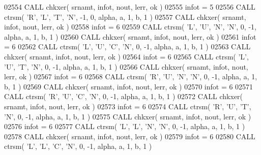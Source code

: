 \begin{DoxyCode}
02554       \textcolor{keyword}{CALL }chkxer( srnamt, infot, nout, lerr, ok )
02555       infot = 5
02556       \textcolor{keyword}{CALL }ctrsm( \textcolor{stringliteral}{'R'}, \textcolor{stringliteral}{'L'}, \textcolor{stringliteral}{'T'}, \textcolor{stringliteral}{'N'}, -1, 0, alpha, a, 1, b, 1 )
02557       \textcolor{keyword}{CALL }chkxer( srnamt, infot, nout, lerr, ok )
02558       infot = 6
02559       \textcolor{keyword}{CALL }ctrsm( \textcolor{stringliteral}{'L'}, \textcolor{stringliteral}{'U'}, \textcolor{stringliteral}{'N'}, \textcolor{stringliteral}{'N'}, 0, -1, alpha, a, 1, b, 1 )
02560       \textcolor{keyword}{CALL }chkxer( srnamt, infot, nout, lerr, ok )
02561       infot = 6
02562       \textcolor{keyword}{CALL }ctrsm( \textcolor{stringliteral}{'L'}, \textcolor{stringliteral}{'U'}, \textcolor{stringliteral}{'C'}, \textcolor{stringliteral}{'N'}, 0, -1, alpha, a, 1, b, 1 )
02563       \textcolor{keyword}{CALL }chkxer( srnamt, infot, nout, lerr, ok )
02564       infot = 6
02565       \textcolor{keyword}{CALL }ctrsm( \textcolor{stringliteral}{'L'}, \textcolor{stringliteral}{'U'}, \textcolor{stringliteral}{'T'}, \textcolor{stringliteral}{'N'}, 0, -1, alpha, a, 1, b, 1 )
02566       \textcolor{keyword}{CALL }chkxer( srnamt, infot, nout, lerr, ok )
02567       infot = 6
02568       \textcolor{keyword}{CALL }ctrsm( \textcolor{stringliteral}{'R'}, \textcolor{stringliteral}{'U'}, \textcolor{stringliteral}{'N'}, \textcolor{stringliteral}{'N'}, 0, -1, alpha, a, 1, b, 1 )
02569       \textcolor{keyword}{CALL }chkxer( srnamt, infot, nout, lerr, ok )
02570       infot = 6
02571       \textcolor{keyword}{CALL }ctrsm( \textcolor{stringliteral}{'R'}, \textcolor{stringliteral}{'U'}, \textcolor{stringliteral}{'C'}, \textcolor{stringliteral}{'N'}, 0, -1, alpha, a, 1, b, 1 )
02572       \textcolor{keyword}{CALL }chkxer( srnamt, infot, nout, lerr, ok )
02573       infot = 6
02574       \textcolor{keyword}{CALL }ctrsm( \textcolor{stringliteral}{'R'}, \textcolor{stringliteral}{'U'}, \textcolor{stringliteral}{'T'}, \textcolor{stringliteral}{'N'}, 0, -1, alpha, a, 1, b, 1 )
02575       \textcolor{keyword}{CALL }chkxer( srnamt, infot, nout, lerr, ok )
02576       infot = 6
02577       \textcolor{keyword}{CALL }ctrsm( \textcolor{stringliteral}{'L'}, \textcolor{stringliteral}{'L'}, \textcolor{stringliteral}{'N'}, \textcolor{stringliteral}{'N'}, 0, -1, alpha, a, 1, b, 1 )
02578       \textcolor{keyword}{CALL }chkxer( srnamt, infot, nout, lerr, ok )
02579       infot = 6
02580       \textcolor{keyword}{CALL }ctrsm( \textcolor{stringliteral}{'L'}, \textcolor{stringliteral}{'L'}, \textcolor{stringliteral}{'C'}, \textcolor{stringliteral}{'N'}, 0, -1, alpha, a, 1, b, 1 )

\end{DoxyCode}
